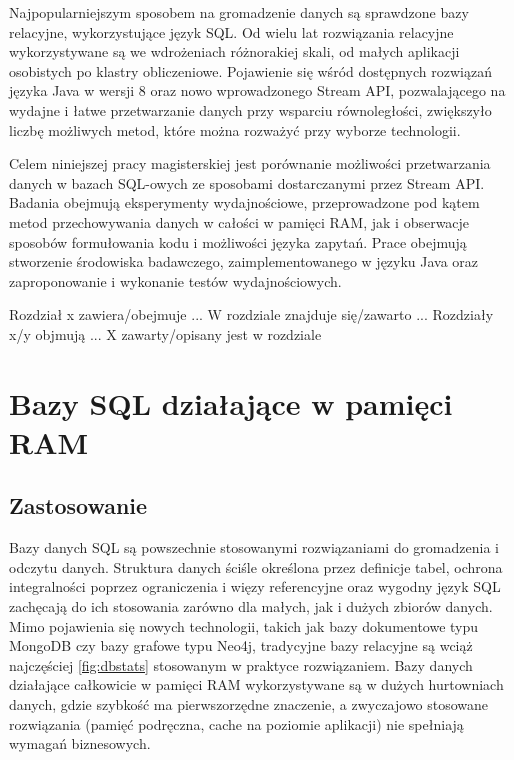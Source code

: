 \documentclass[12pt]{extarticle}
\begin{document}
    Najpopularniejszym sposobem na gromadzenie danych są sprawdzone bazy relacyjne, wykorzystujące język SQL. Od wielu lat rozwiązania relacyjne wykorzystywane są we wdrożeniach różnorakiej skali, od małych aplikacji osobistych po klastry obliczeniowe. Pojawienie się wśród dostępnych rozwiązań języka Java w wersji 8 oraz nowo wprowadzonego Stream API, pozwalającego na wydajne i łatwe przetwarzanie danych przy wsparciu równoległości, zwiększyło liczbę możliwych metod, które można rozważyć przy wyborze technologii.

	Celem niniejszej pracy magisterskiej jest porównanie możliwości przetwarzania danych w bazach SQL-owych ze sposobami dostarczanymi przez Stream API. Badania obejmują eksperymenty wydajnościowe, przeprowadzone pod kątem metod przechowywania danych w całości w pamięci RAM, jak i obserwacje sposobów formułowania kodu i możliwości języka zapytań. Prace obejmują stworzenie środowiska badawczego, zaimplementowanego w języku Java oraz zaproponowanie i wykonanie testów wydajnościowych.

    Rozdział x zawiera/obejmuje ... W rozdziale znajduje się/zawarto ... Rozdziały x/y objmują ... X zawarty/opisany jest w rozdziale

\section{Bazy SQL działające w pamięci RAM}

\subsection{Zastosowanie}

    Bazy danych SQL są powszechnie stosowanymi rozwiązaniami do gromadzenia i odczytu danych. Struktura danych ściśle określona przez definicje tabel, ochrona integralności poprzez ograniczenia i więzy referencyjne oraz wygodny język SQL zachęcają do ich stosowania zarówno dla małych, jak i dużych zbiorów danych. Mimo pojawienia się nowych technologii, takich jak bazy dokumentowe typu MongoDB czy bazy grafowe typu Neo4j, tradycyjne bazy relacyjne są wciąż najczęściej \ref{fig:dbstats} stosowanym w praktyce rozwiązaniem. Bazy danych działające całkowicie w pamięci RAM wykorzystywane są w dużych hurtowniach danych, gdzie szybkość ma pierwszorzędne znaczenie, a zwyczajowo stosowane rozwiązania (pamięć podręczna, cache na poziomie aplikacji) nie spełniają wymagań biznesowych.
\end{document}
